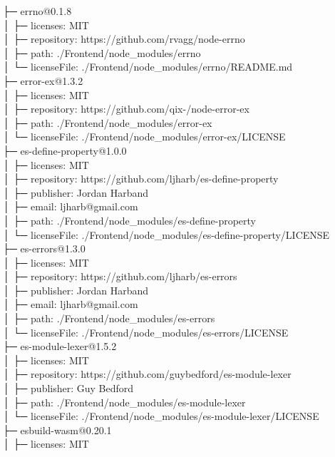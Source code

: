 ├─ errno@0.1.8\\
│  ├─ licenses: MIT\\
│  ├─ repository: https://github.com/rvagg/node-errno\\
│  ├─ path: ./Frontend/node\_modules/errno\\
│  └─ licenseFile: ./Frontend/node\_modules/errno/README.md\\
├─ error-ex@1.3.2\\
│  ├─ licenses: MIT\\
│  ├─ repository: https://github.com/qix-/node-error-ex\\
│  ├─ path: ./Frontend/node\_modules/error-ex\\
│  └─ licenseFile: ./Frontend/node\_modules/error-ex/LICENSE\\
├─ es-define-property@1.0.0\\
│  ├─ licenses: MIT\\
│  ├─ repository: https://github.com/ljharb/es-define-property\\
│  ├─ publisher: Jordan Harband\\
│  ├─ email: ljharb@gmail.com\\
│  ├─ path: ./Frontend/node\_modules/es-define-property\\
│  └─ licenseFile: ./Frontend/node\_modules/es-define-property/LICENSE\\
├─ es-errors@1.3.0\\
│  ├─ licenses: MIT\\
│  ├─ repository: https://github.com/ljharb/es-errors\\
│  ├─ publisher: Jordan Harband\\
│  ├─ email: ljharb@gmail.com\\
│  ├─ path: ./Frontend/node\_modules/es-errors\\
│  └─ licenseFile: ./Frontend/node\_modules/es-errors/LICENSE\\
├─ es-module-lexer@1.5.2\\
│  ├─ licenses: MIT\\
│  ├─ repository: https://github.com/guybedford/es-module-lexer\\
│  ├─ publisher: Guy Bedford\\
│  ├─ path: ./Frontend/node\_modules/es-module-lexer\\
│  └─ licenseFile: ./Frontend/node\_modules/es-module-lexer/LICENSE\\
├─ esbuild-wasm@0.20.1\\
│  ├─ licenses: MIT\\
